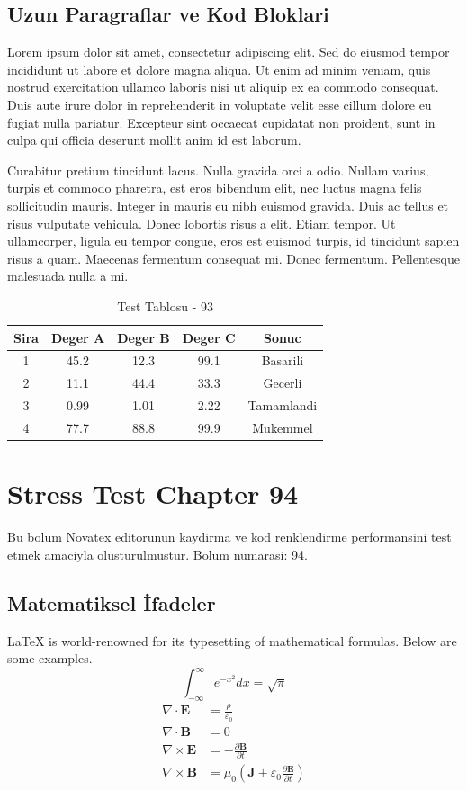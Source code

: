 \documentclass[12pt,a4paper]{article}
\begin{document}
\subsection{Uzun Paragraflar ve Kod Bloklari}
Lorem ipsum dolor sit amet, consectetur adipiscing elit. Sed do eiusmod tempor incididunt ut labore et dolore magna aliqua. Ut enim ad minim veniam, quis nostrud exercitation ullamco laboris nisi ut aliquip ex ea commodo consequat. Duis aute irure dolor in reprehenderit in voluptate velit esse cillum dolore eu fugiat nulla pariatur. Excepteur sint occaecat cupidatat non proident, sunt in culpa qui officia deserunt mollit anim id est laborum.

Curabitur pretium tincidunt lacus. Nulla gravida orci a odio. Nullam varius, turpis et commodo pharetra, est eros bibendum elit, nec luctus magna felis sollicitudin mauris. Integer in mauris eu nibh euismod gravida. Duis ac tellus et risus vulputate vehicula. Donec lobortis risus a elit. Etiam tempor. Ut ullamcorper, ligula eu tempor congue, eros est euismod turpis, id tincidunt sapien risus a quam. Maecenas fermentum consequat mi. Donec fermentum. Pellentesque malesuada nulla a mi.

\begin{table}[h!]
\centering
\begin{tabular}{|c|c|c|c|c|}
\hline
\textbf{Sira} & \textbf{Deger A} & \textbf{Deger B} & \textbf{Deger C} & \textbf{Sonuc} \\
\hline
1 & 45.2 & 12.3 & 99.1 & Basarili \\
2 & 11.1 & 44.4 & 33.3 & Gecerli \\
3 & 0.99 & 1.01 & 2.22 & Tamamlandi \\
4 & 77.7 & 88.8 & 99.9 & Mukemmel \\
\hline
\end{tabular}
\caption{Test Tablosu - 93}
\end{table}

\newpage
\section{Stress Test Chapter 94}
Bu bolum Novatex editorunun kaydirma ve kod renklendirme performansini test etmek amaciyla olusturulmustur. Bolum numarasi: 94.

\subsection{Matematiksel İfadeler}
\LaTeX{} is world-renowned for its typesetting of mathematical formulas. Below are some examples.
\begin{equation}
\int_{-\infty}^{\infty} e^{-x^2} dx = \sqrt{\pi}
\end{equation}
\begin{align}
\nabla \cdot \mathbf{E} &= \frac{\rho}{\varepsilon_0} \\
\nabla \cdot \mathbf{B} &= 0 \\
\nabla \times \mathbf{E} &= -\frac{\partial \mathbf{B}}{\partial t} \\
\nabla \times \mathbf{B} &= \mu_0\left(\mathbf{J} + \varepsilon_0 \frac{\partial \mathbf{E}}{\partial t}\right)
\end{align}
\end{document}
